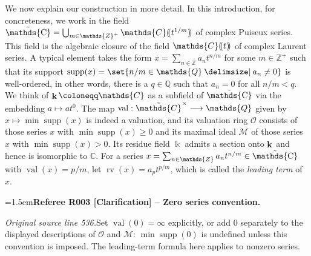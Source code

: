 \documentclass[12pt]{amsart}
\newcommand{\RefereeRemark}[4]{%
  \par\medskip\begingroup\normalfont\small\color{RefereePurple}%
  \emergencystretch=1.5em\noindent\textbf{Referee R#1 [#2] -- #3.}\par\nobreak\noindent #4\par
  \endgroup\medskip
}
\newcommand{\memph}[1]{{\color{magenta}\emph{#1}}}
\theoremstyle{plain}
\theoremstyle{definition}
\theoremstyle{remark}
\numberwithin{equation}{section}
\theoremstyle{plain}
\newcommand{\MM}{\mdl M}
\newcommand{\OO}{\mdl O}
\DeclareMathOperator{\supp}{supp}
\DeclareMathOperator{\K}{\mathds{k}}
\newcommand{\Z}{\mathds{Z}}
\newcommand{\C}{\mathds{C}}
\newcommand{\Q}{\mathds{Q}}
\newcommand{\0}{\emptyset}
\newcommand{\dpar}[1]{%
   (\mkern-4mu (#1 )\mkern-4mu )}
\newcommand{\mdl}[1]{\mathcal{#1}}  %
\newcommand{\fun}{\longrightarrow}
\newcommand{\efun}{\longmapsto}
\newcommand{\mi}{\smallsetminus}
\providecommand\given{}
\newcommand\SetSymbol[1][]{%
\nonscript \: #1 \vert
\allowbreak
\nonscript\:
\mathopen{}}
\renewcommand\given{\SetSymbol[\delimsize]}
\DeclareMathOperator{\rv}{rv}
\DeclareMathOperator{\vv}{val}
\DeclareMathOperator{\gsk}{\mathbf{K}_+}
\DeclareMathOperator{\ggk}{\mathbf{K}}
\DeclareMathOperator{\bfk}{\bf k}
\DeclareMathOperator{\puC}{\tilde \C}
\begin{document}
We now explain our construction in more detail.
In this introduction, for concreteness, we work in  the field $\puC = \bigcup_{m \in \Z^+} \C \dpar{ t^{1 / m} }$ of complex Puiseux series. This field is the algebraic closure of the field $\C \dpar t$ of complex Laurent series. A typical element  takes the form $x = \sum_{n \in \Z} a_n t^{n/m}$ for some $m \in \Z^+$ such that its support $\supp(x) = \set{n/m \in \Q \given a_n \neq 0 }$ is well-ordered, in other words, there is a $q \in \Q$ such that $a_n = 0$ for all $n/m < q$. We think of $\bfk \coloneqq \C$ as a subfield of $\puC$ via the embedding $a \efun at^0$. The map $\vv: \tilde \C^\times \fun \Q$ given by $x \efun \min\supp(x)$ is indeed a valuation, and its valuation ring $\OO$ consists of those series $x$ with $\min\supp(x) \geq 0$ and its maximal ideal $\MM$ of those series $x$ with $\min\supp(x) > 0$. Its residue field $\K$ admits a section onto $\bfk$ and hence is isomorphic to $\C$. For a series $x = \sum_{n \in \Z} a_n t^{n/m} \in \puC$ with $\vv(x) = p/m$, let $\rv(x) = a_p t^{p/m}$, which is called the \memph{leading term} of $x$.

\RefereeRemark{003}{Clarification}{Zero series convention}{%
\textit{Original source line 536.}\quad Set $\vv(0)=\infty$ explicitly, or add $0$ separately to the displayed descriptions of $\OO$ and $\MM$: $\min\supp(0)$ is undefined unless this convention is imposed. The leading-term formula here applies to nonzero series.
}
\end{document}
